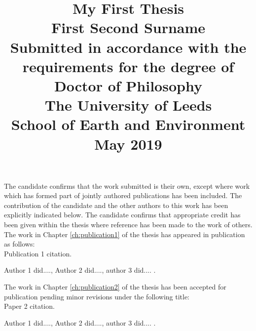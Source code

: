 \documentclass[titlepage,twoside,onecolumn,a4paper,11pt]{report}
\begin{document}

\makeatletter
\def\cleardoublepage{\clearpage\if@twoside \ifodd\c@page\else%
\hbox{}%
\thispagestyle{empty}
\newpage%
\if@twocolumn\hbox{}\newpage\fi\fi\fi}
\makeatother

\title{
\Huge{\textbf{My First Thesis}}\\[2cm]
\Large{{\bf First Second Surname}} \\[4cm]
\large{Submitted in accordance with the requirements for the degree of\\
Doctor of Philosophy} \\[2cm]
\large{The University of Leeds}\\
\large{School of Earth and Environment}\\ [2cm]
\large{May 2019} }
\author{} \date{}
\maketitle
\cleardoublepage

The candidate confirms that the work submitted is their own, except where work which has formed part of jointly authored publications has been included. The contribution of the candidate and the other authors to this work has been explicitly indicated below. The candidate confirms that appropriate credit has been given within the thesis where reference has been made to the work of others.\\

The work in Chapter \ref{ch:publication1} of the thesis has appeared in publication as follows:\\
Publication 1 citation.

Author 1 did...., Author 2 did...., author 3 did.... .
\vspace{5mm}

The work in Chapter \ref{ch:publication2} of the thesis has been accepted for publication pending minor revisions under the following title:\\
Paper 2 citation.

Author 1 did...., Author 2 did...., author 3 did.... .
\vspace{5mm}
\end{document}
